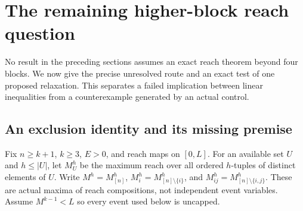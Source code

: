 \section{The remaining higher-block reach question}\label{sec:higher-reach}

No result in the preceding sections assumes an exact reach theorem beyond
four blocks. We now give the precise unresolved route and an exact test
of one proposed relaxation. This separates a failed implication between
linear inequalities from a counterexample generated by an actual control.

\subsection{An exclusion identity and its missing premise}

Fix $n\ge k+1$, $k\ge3$, $E>0$, and reach maps on $[0,L]$.
For an available set $U$ and $h\le |U|$, let $M_U^h$ be the maximum
reach over all ordered $h$-tuples of distinct elements of $U$.
Write $M^h=M_{[n]}^h$, $M_i^h=M_{[n]\setminus\{i\}}^h$, and
$M_{ij}^h=M_{[n]\setminus\{i,j\}}^h$. These are actual maxima of
reach compositions, not independent event variables. Assume
$M^{k-1}<L$ so every event used below is uncapped.

